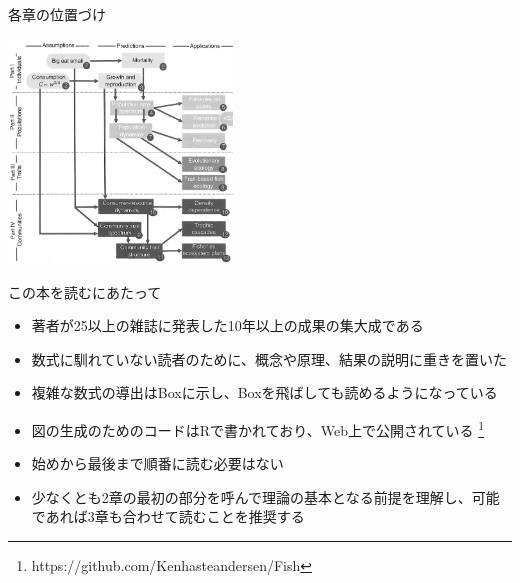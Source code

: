 \documentclass[
  ignorenonframetext,
]{beamer}
\providecommand{\tightlist}{%
  \setlength{\itemsep}{0pt}\setlength{\parskip}{0pt}}
\newcommand{\vspacesmall}{\vspace{3mm}}
\begin{document}
\begin{frame}{各章の位置づけ}
\protect\hypertarget{ux5404ux7ae0ux306eux4f4dux7f6eux3065ux3051}{}

\begin{center}\includegraphics[width=225px]{Fig2} \end{center}

\end{frame}

\begin{frame}{この本を読むにあたって}
\protect\hypertarget{ux3053ux306eux672cux3092ux8aadux3080ux306bux3042ux305fux3063ux3066}{}

\begin{itemize}
\tightlist
\item
  著者が25以上の雑誌に発表した10年以上の成果の集大成である\\
  \vspacesmall
\item
  数式に馴れていない読者のために、概念や原理、結果の説明に重きを置いた\\
  \vspacesmall
\item
  複雑な数式の導出はBoxに示し、Boxを飛ばしても読めるようになっている\\
  \vspacesmall
\item
  図の生成のためのコードはRで書かれており、Web上で公開されている
  \footnote[frame]{https://github.com/Kenhasteandersen/Fish}\\
  \vspacesmall
\item
  始めから最後まで順番に読む必要はない\\
  \vspacesmall
\item
  少なくとも2章の最初の部分を呼んで理論の基本となる前提を理解し、可能であれば3章も合わせて読むことを推奨する
\end{itemize}

\end{frame}
\end{document}
